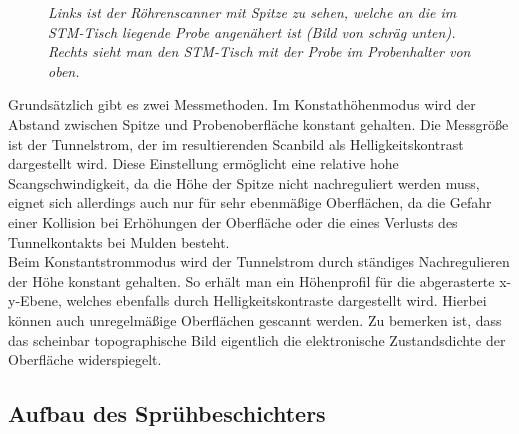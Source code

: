 \begin{figure}[H]
\centering
\sffamily

\caption{\textit{Links ist der Röhrenscanner mit Spitze zu sehen, welche an die im STM-Tisch
liegende Probe angenähert ist (Bild von schräg unten). Rechts sieht man den STM-Tisch mit der
Probe im Probenhalter von oben.}}
\label{stmaufbau}
\end{figure}

Grundsätzlich gibt es zwei Messmethoden. Im Konstathöhenmodus wird der Abstand zwischen Spitze und
Probenoberfläche konstant gehalten. Die Messgröße ist der Tunnelstrom, der im resultierenden
Scanbild als Helligkeitskontrast dargestellt wird. Diese Einstellung ermöglicht eine relative hohe
Scangschwindigkeit, da die Höhe der Spitze nicht nachreguliert werden muss, eignet sich
allerdings auch nur für sehr ebenmäßige Oberflächen, da die Gefahr einer Kollision bei Erhöhungen
der Oberfläche oder die eines Verlusts des Tunnelkontakts bei Mulden besteht.\\
Beim Konstantstrommodus wird der Tunnelstrom durch ständiges Nachregulieren der Höhe konstant
gehalten. So erhält man ein Höhenprofil für die abgerasterte x-y-Ebene, welches ebenfalls durch
Helligkeitskontraste dargestellt wird. Hierbei können auch unregelmäßige Oberflächen gescannt
werden. Zu bemerken ist, dass das scheinbar topographische Bild eigentlich die elektronische
Zustandsdichte der Oberfläche widerspiegelt.


\subsection{Aufbau des Sprühbeschichters}
\FloatBarrier

